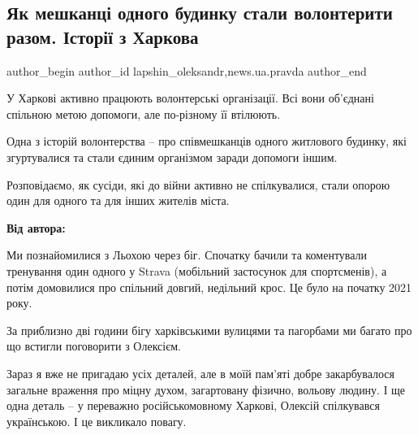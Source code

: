  
 
 
 
 
 
\subsection{Як мешканці одного будинку стали волонтерити разом. Історії з Харкова}
\label{sec:17_04_2022.stz.news.ua.pravda.2.budynok_volontery_istorii_harkov}
 
\ifcmt
 author_begin
   author_id lapshin_oleksandr,news.ua.pravda
 author_end
\fi


\begin{zznagolos}
У Харкові активно працюють волонтерські організації. Всі вони об'єднані
спільною метою допомоги, але по-різному її втілюють.

Одна з історій волонтерства – про співмешканців одного житлового будинку, які
згуртувалися та стали єдиним організмом заради допомоги іншим.

Розповідаємо, як сусіди, які до війни активно не спілкувалися, стали опорою
один для одного та для інших жителів міста.
\end{zznagolos}


\textbf{Від автора:}

Ми познайомилися з Льохою через біг. Спочатку бачили та коментували тренування
один одного у Strava (мобільний застосунок для спортсменів), а потім домовилися
про спільний довгий, недільний крос. Це було на початку 2021 року.

За приблизно дві години бігу харківськими вулицями та пагорбами ми багато про
що встигли поговорити з Олексієм.

Зараз я вже не пригадаю усіх деталей, але в моїй пам’яті добре закарбувалося
загальне враження про міцну духом, загартовану фізично, вольову людину. І ще
одна деталь – у переважно російськомовному Харкові, Олексій спілкувався
українською. І це викликало повагу.

